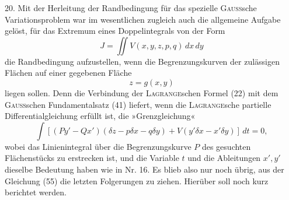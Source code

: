 \clearpage\begingroup\NoSourceHead{}
\makeatletter\tagsleft@true\let\veqno\@@leqno\makeatother
\renewcommand{\thefootnote}{\arabic{footnote})}\setcounter{footnote}{53}
\newcommand{\BolzaEqualAboveGreater}{\mathrel{\vcenter{\hbox{\begin{tikzpicture}[x=1em,y=1ex,line width=.04em]
\draw(0,.95)--(.65,.95);\draw(0,.70)--(.65,.70);\draw(0,.40)--(.65,.04)--(0,-.32);
\end{tikzpicture}}}}}
\noindent\hspace*{\parindent}20. Mit der Herleitung der Randbedingung für das spezielle \textsc{Gauss}sche
Variationsproblem war im wesentlichen zugleich auch die allgemeine Aufgabe
gelöst, für das Extremum eines Doppelintegrals von der Form
\begin{equation*}
J=\iint V(x,y,z,p,q)\,dx\,dy\tag{53}
\end{equation*}
die Randbedingung aufzustellen, wenn die Begrenzungskurven der zulässigen
Flächen auf einer gegebenen Fläche
\begin{equation*}
z=g(x,y)\tag{54}
\end{equation*}
liegen sollen. Denn die Verbindung der \textsc{Lagrange}schen Formel (22) mit dem
\textsc{Gauss}schen Fundamentalsatz (41) liefert, wenn die \textsc{Lagrange}sche partielle
Differentialgleichung erfüllt ist, die »Grenzgleichung«
\begin{equation*}
\int[(Py'-Qx')(\delta z-p\delta x-q\delta y)+V(y'\delta x-x'\delta y)]\,dt=0,\tag{55}
\end{equation*}
\clearpage{}
\noindent wobei das Linienintegral über die Begrenzungskurve $P$ des gesuchten Flächenstücks
zu erstrecken ist, und die Variable $t$ und die Ableitungen $x',y'$ dieselbe
Bedeutung haben wie in Nr. 16. Es blieb also nur noch übrig, aus der
Gleichung (55) die letzten Folgerungen zu ziehen. Hierüber soll noch kurz
berichtet werden.

